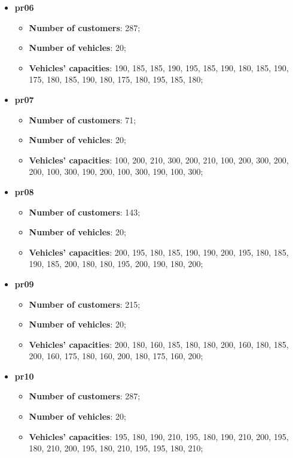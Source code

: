 \documentclass[../main.tex]{subfiles}
\begin{document}
\begin{itemize}
    \item \textbf{pr06}
        \begin{itemize}
            \item \textbf{Number of customers}: 287;
            \item \textbf{Number of vehicles}: 20;
            \item \textbf{Vehicles' capacities}: 190, 185, 185, 190, 195, 185, 190, 180, 185, 190, 175, 180, 185, 190, 180, 175, 180, 195, 185, 180;
        \end{itemize}

    \item \textbf{pr07}
        \begin{itemize}
            \item \textbf{Number of customers}: 71;
            \item \textbf{Number of vehicles}: 20;
            \item \textbf{Vehicles' capacities}: 100, 200, 210, 300, 200, 210, 100, 200, 300, 200, 200, 100, 300, 190, 200, 100, 300, 190, 100, 300;
        \end{itemize}

    \item \textbf{pr08}
        \begin{itemize}
            \item \textbf{Number of customers}: 143;
            \item \textbf{Number of vehicles}: 20;
            \item \textbf{Vehicles' capacities}: 200, 195, 180, 185, 190, 190, 200, 195, 180, 185, 190, 185, 200, 180, 180, 195, 200, 190, 180, 200;
        \end{itemize}

    \item \textbf{pr09}
        \begin{itemize}
            \item \textbf{Number of customers}: 215;
            \item \textbf{Number of vehicles}: 20;
            \item \textbf{Vehicles' capacities}: 200, 180, 160, 185, 180, 180, 200, 160, 180, 185, 200, 160, 175, 180, 160, 200, 180, 175, 160, 200;
        \end{itemize}

    \item \textbf{pr10}
        \begin{itemize}
            \item \textbf{Number of customers}: 287;
            \item \textbf{Number of vehicles}: 20;
            \item \textbf{Vehicles' capacities}: 195, 180, 190, 210, 195, 180, 190, 210, 200, 195, 180, 210, 200, 195, 180, 210, 195, 195, 180, 210;
        \end{itemize}


\end{itemize}
\end{document}
